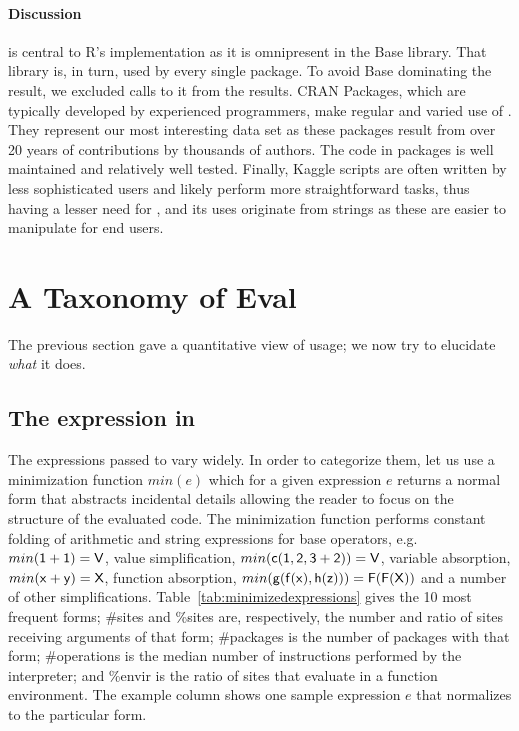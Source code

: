 \documentclass[review,screen,acmsmall]{acmart}
\begin{document}
\paragraph{Discussion}
\Eval is central to R's implementation as it is omnipresent in the Base library.
That library is, in turn, used by every single package. To avoid Base dominating
the result, we excluded calls to it from the results. CRAN Packages, which are
typically developed by experienced programmers, make regular and varied use of
\eval. They represent our most interesting data set as these packages result
from over 20 years of contributions by thousands of authors. The code in
packages is well maintained and relatively well tested. Finally, Kaggle scripts
are often written by less sophisticated users and likely perform more
straightforward tasks, thus having a lesser need for \eval, and its uses
originate from strings as these are easier to manipulate for end users.

\section{A Taxonomy of Eval}

The previous section gave a quantitative view of \eval usage; we now try to
elucidate \emph{what} it does.

\subsection{The expression in \eval} \label{sec:minimized}


The expressions passed to \eval vary widely. In order to categorize them, let us
use a minimization function $min(e)$ which for a given expression $e$ returns a
normal form that abstracts incidental details allowing the reader to focus on
the structure of the evaluated code. The minimization function performs constant
folding of arithmetic and string expressions for base operators, e.g.
$min({\sf 1+1})={\sf V}$, value simplification, $min({\sf c(1,2,3+2)})={\sf V}$,
variable absorption, $min({\sf x+y})={\sf X}$, function absorption,
$min({\sf g(f(x),h(z))})={\sf F(F(X))}$ and a number of other simplifications.
Table~\ref{tab:minimizedexpressions} gives the 10 most frequent forms; \#sites
and \%sites are, respectively, the number and ratio of sites receiving arguments
of that form; \#packages is the number of packages with that form; \#operations
is the median number of instructions performed by the interpreter; and \%envir
is the ratio of sites that evaluate in a function environment. The example
column shows one sample expression $e$ that normalizes to the particular form.
\end{document}
